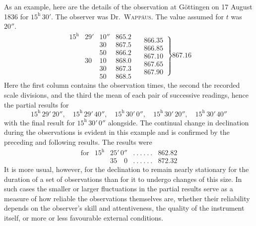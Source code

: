 As an example, here are the details of the observation at Göttingen on 17 August 1836 for $15^{\mathrm h}\,30'$. The observer was Dr.~\textsc{Wappäus}. The value assumed for $t$ was $20''$.
\[
\begin{array}{rrr|r|}
15^{\mathrm h}&29'&10''&865.2\\
&&30&867.5\\
&&50&866.2\\
&30&10&868.0\\
&&30&867.3\\
&&50&868.5
\end{array}
\quad
\left.\begin{array}{r}866.35\\866.85\\867.10\\867.65\\867.90\end{array}\right\}867.16
\]
Here the first column contains the observation times, the second the recorded scale divisions, and the third the mean of each pair of successive readings, hence the partial results for
\[
15^{\mathrm h}\,29'\,20'',\quad15^{\mathrm h}\,29'\,40'',\quad15^{\mathrm h}\,30'\,0'',\quad15^{\mathrm h}\,30'\,20'',\quad15^{\mathrm h}\,30'\,40''
\]
with the final result for $15^{\mathrm h}\,30'\,0''$ alongside. The continual change in declination during the observations is evident in this example and is confirmed by the preceding and following results. The results were
\[
\begin{array}{lrrll}
\text{for}&15^{\mathrm h}&25'\,0''&.\ .\ .\ .\ .\ .&862.82\\
&&35\quad0&.\ .\ .\ .\ .\ .&872.32
\end{array}
\]
It is more usual, however, for the declination to remain nearly stationary for the duration of a set of observations than for it to undergo changes of this size. In such cases the smaller or larger fluctuations in the partial results serve as a measure of how reliable the observations themselves are, whether their reliability depends on the observer’s skill and attentiveness, the quality of the instrument itself, or more or less favourable external conditions.

